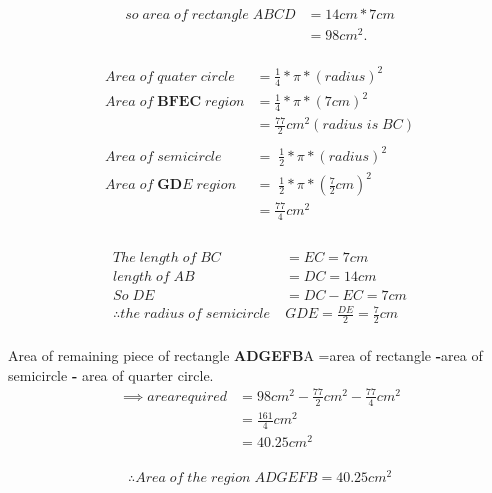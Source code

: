\documentclass{article}
\begin{document}
\begin{center}
 \begin{align*}
     so\;area\;of\;rectangle\;ABCD &= 14cm*7cm\\
                 &= 98cm^2.\\
\end{align*}
\end{center}

\begin{align*}
Area\;of\;quater\;circle &= \frac{1}{4}*\pi*(radius)^2\\
Area\;of\;\textbf{BFEC}\;region &= \frac{1}{4}*\pi*(7cm)^2\\ 
    &= \frac{77}{2}cm^2(radius\;is\;BC)\\
    \\
Area\;of\;semicircle\;&=\;\frac{1}{2}*\pi*(radius)^2\\
Area\;of\;\textbf{GD}E\;region\;&=\;\frac{1}{2}*\pi*(\frac{7}{2}cm)^2\\
    &= \frac{77}{4}cm^2 \\ \\
\end{align*}
    
\begin{align*}
The\;length\;of\;BC &= EC = 7cm \\
length\;of\;AB &= DC = 14cm \\
   So\;DE &= DC - EC = 7cm \\ 
   \therefore the\;radius\;of\;semicircle\;&GDE= \frac{DE}{2} = \frac{7}{2}cm\\
\end{align*}


\begin{center}
Area of remaining piece of rectangle \textbf{ADGEFB}A =area of rectangle
\textbf{-}area of semicircle\textbf{ - }area of quarter circle.\\
\begin{align*}
\implies area required &=98cm^{2} - \frac{77}{2}cm^{2} - \frac{77}{4}cm^{2}\\ 
&= \frac{161}{4}cm^{2} \\
&= 40.25cm^{2}  \\
\end{align*}
\end{center}

\begin{center}
 $$\therefore Area\;of\; the\; region\;ADGEFB = 40.25cm^2$$    
\end{center}
\end{document}
